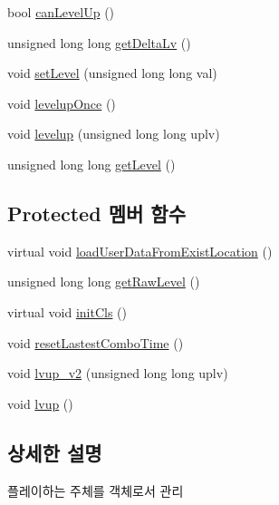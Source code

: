 \begin{DoxyCompactItemize}
$$bool \hyperlink{class_tetris_1_1_users_1_1_game_user_a93e385fd100ac5ec2f6f6b9f0fab2950}{can\+Level\+Up} ()
\item 
unsigned long long \hyperlink{class_tetris_1_1_users_1_1_game_user_a1a55323cff69015417ad4d214b985724}{get\+Delta\+Lv} ()
\item 
void \hyperlink{class_tetris_1_1_users_1_1_game_user_a40603ad69564036b53b99cdd67fe5451}{set\+Level} (unsigned long long val)
\item 
void \hyperlink{class_tetris_1_1_users_1_1_game_user_af8ec964e749d90e60df8a4d7c63b4017}{levelup\+Once} ()
\item 
void \hyperlink{class_tetris_1_1_users_1_1_game_user_ae5f2fd276485ee3f677896c3cc03462a}{levelup} (unsigned long long uplv)
\item 
unsigned long long \hyperlink{class_tetris_1_1_users_1_1_game_user_ae052e17a9bdcb0d8bc98c287592f7d7b}{get\+Level} ()
\end{DoxyCompactItemize}
\subsection*{Protected 멤버 함수}
\begin{DoxyCompactItemize}
\item 
virtual void \hyperlink{class_tetris_1_1_users_1_1_game_user_a730bd78525a4802685b53c67b38eca0c}{load\+User\+Data\+From\+Exist\+Location} ()
\item 
unsigned long long \hyperlink{class_tetris_1_1_users_1_1_game_user_a3e232d2f4a0610e51136bec11453858b}{get\+Raw\+Level} ()
\item 
virtual void \hyperlink{class_tetris_1_1_users_1_1_game_user_a8ec8ca43d0c6d0dc2c2e049ae1b4d316}{init\+Cls} ()
\item 
void \hyperlink{class_tetris_1_1_users_1_1_game_user_a442b35545b13a23dca566cf1b43eb82d}{reset\+Lastest\+Combo\+Time} ()
\item 
void \hyperlink{class_tetris_1_1_users_1_1_game_user_aacc605ed22d2b982a106659ef94fb3c9}{lvup\+\_\+v2} (unsigned long long uplv)
\item 
void \hyperlink{class_tetris_1_1_users_1_1_game_user_ad7bdfbb3fc18ca0a1cdfcb34faaed6ff}{lvup} ()
\end{DoxyCompactItemize}


\subsection{상세한 설명}
플레이하는 주체를 객체로서 관리 

